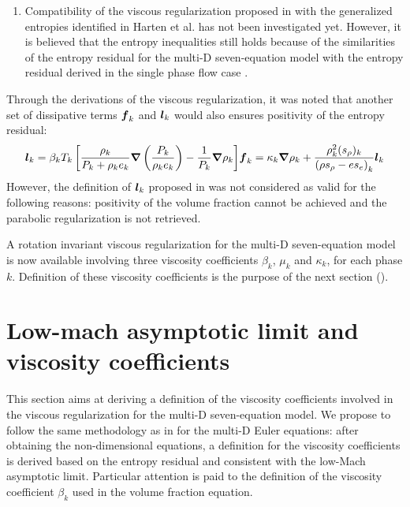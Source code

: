 \begin{enumerate}
\item{Compatibility of the viscous regularization proposed in  with the generalized entropies identified in Harten et al. \cite{Harten} has not been investigated yet. However, it is believed that the entropy inequalities still holds because of the similarities of the entropy residual for the multi-D seven-equation model with the entropy residual derived in the single phase flow case \cite{jlg}.} 
\end{enumerate}
%
Through the derivations of the viscous regularization, it was noted that another set of dissipative terms $\boldsymbol f_k$ and $\boldsymbol l_k$ would also ensures positivity of the entropy residual:
%
\begin{subequations}
\begin{align}\label{eq:def-l-k-wrong-sect4}
\mbold l_k =\beta_k T_k \left[ \frac{\rho_k}{P_k+\rho_k e_k} \grad \left( \frac{P_k}{\rho_k e_k} \right) - \frac{1}{P_k} \grad \rho_k \right]
\end{align}
\begin{align}
\mbold f_k = \kappa_k \grad \rho_k +  \frac{\rho^2_k (s_{\rho})_k}{\left( \rho s_{\rho} - e s_e \right)_k} \mbold l_k
\end{align}
\end{subequations}
%
However, the definition of $\boldsymbol l_k$ proposed in  was not considered as valid for the following reasons: positivity of the volume fraction cannot be achieved and the parabolic regularization is not retrieved.

A rotation invariant viscous regularization for the multi-D seven-equation model is now available involving three viscosity coefficients $\beta_k$, $\mu_k$ and $\kappa_k$, for each phase $k$. Definition of these viscosity coefficients is the purpose of the next section ().
\section{Low-mach asymptotic limit and viscosity coefficients}\label{sec:sev-equ-visc-coeff-sect4}
This section aims at deriving a definition of the viscosity coefficients involved in the viscous regularization for the multi-D seven-equation model. We propose to follow the same methodology as in  for the multi-D Euler equations: after obtaining the non-dimensional equations, a definition for the viscosity coefficients is derived based on the entropy residual and consistent with the low-Mach asymptotic limit. Particular attention is paid to the definition of the viscosity coefficient $\beta_k$ used in the volume fraction equation.

